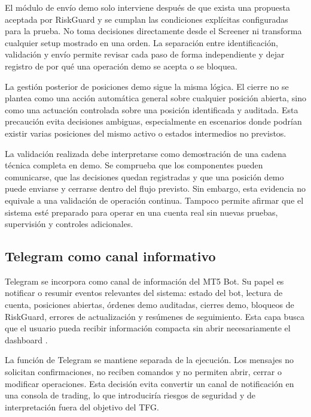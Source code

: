 El m\'odulo de env\'io demo solo interviene despu\'es de que exista una propuesta
aceptada por RiskGuard y se cumplan las condiciones expl\'icitas configuradas
para la prueba. No toma decisiones directamente desde el Screener ni transforma
cualquier setup mostrado en una orden. La separaci\'on entre identificaci\'on,
validaci\'on y env\'io permite revisar cada paso de forma independiente y dejar
registro de por qu\'e una operaci\'on demo se acepta o se bloquea.

La gesti\'on posterior de posiciones demo sigue la misma l\'ogica. El cierre no se
plantea como una acci\'on autom\'atica general sobre cualquier posici\'on abierta,
sino como una actuaci\'on controlada sobre una posici\'on identificada y
auditada. Esta precauci\'on evita decisiones ambiguas, especialmente en
escenarios donde podr\'ian existir varias posiciones del mismo activo o estados
intermedios no previstos.

La validaci\'on realizada debe interpretarse como demostraci\'on de una cadena
t\'ecnica completa en demo. Se comprueba que los componentes pueden comunicarse,
que las decisiones quedan registradas y que una posici\'on demo puede enviarse y
cerrarse dentro del flujo previsto. Sin embargo, esta evidencia no equivale a
una validaci\'on de operaci\'on continua. Tampoco permite afirmar que el sistema
est\'e preparado para operar en una cuenta real sin nuevas pruebas, supervisi\'on
y controles adicionales.

\subsection{Telegram como canal informativo}
\label{subsec:telegram-observabilidad-informativa}

Telegram se incorpora como canal de informaci\'on del MT5 Bot. Su papel es
notificar o resumir eventos relevantes del sistema: estado del bot, lectura de
cuenta, posiciones abiertas, \'ordenes demo auditadas, cierres demo, bloqueos de
RiskGuard, errores de actualizaci\'on y res\'umenes de seguimiento. Esta capa
busca que el usuario pueda recibir informaci\'on compacta sin abrir
necesariamente el dashboard \cite{telegram_bot_api}.

La funci\'on de Telegram se mantiene separada de la ejecuci\'on. Los mensajes no
solicitan confirmaciones, no reciben comandos y no permiten abrir, cerrar o
modificar operaciones. Esta decisi\'on evita convertir un canal de notificaci\'on
en una consola de trading, lo que introducir\'ia riesgos de seguridad y de
interpretaci\'on fuera del objetivo del TFG.

